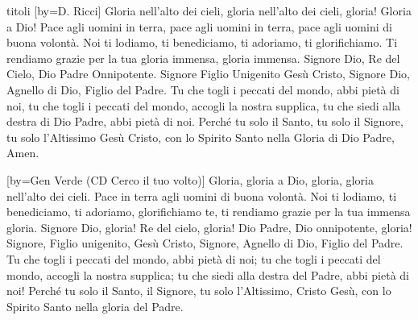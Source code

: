 \begin{songs}{titoli}
[by={D. Ricci}]
\beginchorus
Gloria nell'alto dei cieli, gloria nell'alto dei cieli,
gloria! Gloria a Dio!
Pace agli uomini in terra, pace agli uomini in terra,
pace agli uomini di buona volontà.
\endchorus
\beginverse
Noi ti lodiamo, ti benediciamo, ti adoriamo, ti glorifichiamo.
Ti rendiamo grazie per la tua gloria immensa, gloria immensa.
Signore Dio, Re del Cielo, Dio Padre Onnipotente. 
\endverse
\beginverse
Signore Figlio Unigenito Gesù Cristo,
Signore Dio, Agnello di Dio, Figlio del Padre.
Tu che togli i peccati del mondo, abbi pietà di noi,
tu che togli i peccati del mondo, accogli la nostra supplica,
tu che siedi alla destra di Dio Padre, abbi pietà di noi.
\endverse
\beginverse
Perché tu solo il Santo, tu solo il Signore,
tu solo l'Altissimo Gesù Cristo,
con lo Spirito Santo nella Gloria di Dio Padre,
Amen.
\endverse
\endsong

[by={Gen Verde (CD Cerco il tuo volto)}]
\beginchorus
Gloria, gloria a Dio,
gloria, gloria nell'alto dei cieli.
Pace in terra agli uomini
di buona volontà.
\endchorus
\beginverse
Noi ti lodiamo, ti benediciamo, ti adoriamo, glorifichiamo te,
ti rendiamo grazie per la tua immensa gloria.
Signore Dio, gloria!
Re del cielo, gloria!
Dio Padre, Dio onnipotente, gloria!
\endverse
\beginverse
Signore, Figlio unigenito, Gesù Cristo,
Signore, Agnello di Dio, Figlio del Padre.
Tu che togli i peccati del mondo, abbi pietà di noi;
tu che togli i peccati del mondo, accogli la nostra supplica;
tu che siedi alla destra del Padre, abbi pietà di noi!
\endverse
\beginverse
Perché tu solo il Santo, il Signore, tu solo l'Altissimo, Cristo Gesù,
con lo Spirito Santo nella gloria del Padre.
\endverse
\endsong

\end{songs}
